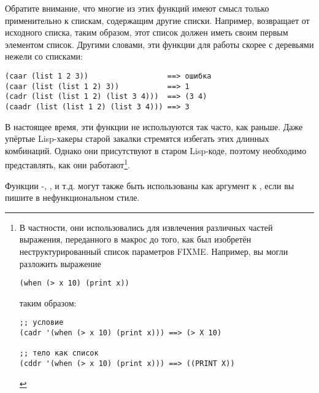 Обратите внимание, что многие из этих функций имеют смысл только применительно к спискам,
содержащим другие списки. Например,  возвращает  от 
исходного списка, таким образом, этот список должен иметь своим первым элементом
список. Другими словами, эти функции для работы скорее с деревьями нежели со списками:

\begin{lstlisting}
(caar (list 1 2 3))                  ==> ошибка
(caar (list (list 1 2) 3))           ==> 1
(cadr (list (list 1 2) (list 3 4)))  ==> (3 4)
(caadr (list (list 1 2) (list 3 4))) ==> 3
\end{lstlisting}

В настоящее время, эти функции не используются так часто, как раньше. Даже упёртые
Lisp-хакеры старой закалки стремятся избегать этих длинных комбинаций. Однако они
присутствуют в старом Lisp-коде, поэтому необходимо представлять, как они
работают\footnote{В частности, они использовались для извлечения различных частей
  выражения, переданного в макрос до того, как был изобретён неструктурированный список
  параметров FIXME. Например, вы могли разложить выражение

\begin{lstlisting}
(when (> x 10) (print x))
\end{lstlisting}

таким образом:

\begin{lstlisting}
;; условие
(cadr '(when (> x 10) (print x))) ==> (> X 10)

;; тело как список
(cddr '(when (> x 10) (print x))) ==> ((PRINT X))
\end{lstlisting}
}.

Функции -, ,  и т.д. могут также быть
использованы как аргумент к , если вы пишите в нефункциональном стиле.

